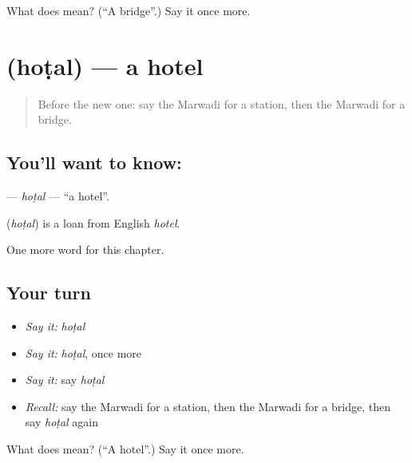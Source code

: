 \begin{tcolorbox}[breakable,colback=teal!4,colframe=teal!35!black,title={Before you move on}]
What does  mean? (\textquotedblleft{}A bridge\textquotedblright{}.) Say it once more.
\end{tcolorbox}
\section[\texorpdfstring{\mw{होटल} (hoṭal)}{होटल (hoṭal)}]{ (hoṭal) — a hotel}

\label{lesson:MW-C83-hotal}



\begin{quote}
Before the new one: say the Marwadi for a station, then the Marwadi for a bridge.
\end{quote}

\subsection*{You'll want to know: }
\textbf{} — \emph{hoṭal} — \textquotedblleft{}a hotel\textquotedblright{}.

\begin{cousinweb}
\textbf{} (\emph{hoṭal}) is a loan from English \emph{hotel}.
\end{cousinweb}

\begin{grammarlens}[title={What you've built}]
One more word for this chapter.
\end{grammarlens}

\subsection*{Your turn}
\begin{itemize}
\raggedright
  \item \emph{Say it:} \emph{hoṭal}
  \item \emph{Say it:} \emph{hoṭal}, once more
  \item \emph{Say it:} say \emph{hoṭal}
  \item \emph{Recall:} say the Marwadi for a station, then the Marwadi for a bridge, then say \emph{hoṭal} again
\end{itemize}

\begin{tcolorbox}[breakable,colback=teal!4,colframe=teal!35!black,title={Before you move on}]
What does  mean? (\textquotedblleft{}A hotel\textquotedblright{}.) Say it once more.
\end{tcolorbox}
